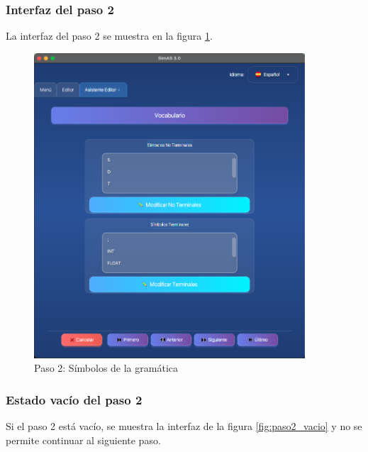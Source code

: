 \subsubsection{Interfaz del paso 2}

La interfaz del paso 2 se muestra en la figura \ref{fig:paso2_simbolos}.

\needspace{8cm}
\begin{figure}[H]
    \centering
    \includegraphics[width=0.9\textwidth]{figuras/editor/paso2_simbolos.png}
    \caption{Paso 2: Símbolos de la gramática}
    \label{fig:paso2_simbolos}
\end{figure}

\subsubsection{Estado vacío del paso 2}

Si el paso 2 está vacío, se muestra la interfaz de la figura \ref{fig:paso2_vacio} y no se permite continuar al siguiente paso.

